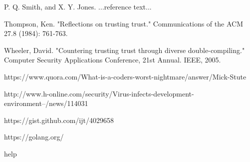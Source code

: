 \documentclass[10pt]{sigplanconf}
\begin{document}




\begin{thebibliography}{}
\softraggedright

P. Q. Smith, and X. Y. Jones. ...reference text...

Thompson, Ken. "Reflections on trusting trust." Communications of the ACM 27.8 (1984): 761-763.

Wheeler, David. "Countering trusting trust through diverse double-compiling." Computer Security Applications Conference, 21st Annual. IEEE, 2005.

https://www.quora.com/What-is-a-coders-worst-nightmare/answer/Mick-Stute

http://www.h-online.com/security/Virus-infects-development-environment--/news/114031

https://gist.github.com/ijt/4029658

https://golang.org/

help
\end{thebibliography}
\end{document}
